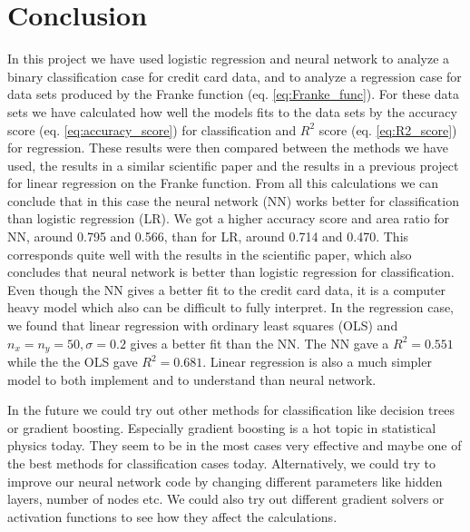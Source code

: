 \documentclass[12pt,a4paper,english]{article}
\begin{document}
\section{Conclusion}
In this project we have used logistic regression and neural network to analyze a binary classification case for credit card data, and to analyze a regression case for data sets produced by the Franke function (eq. \ref{eq:Franke_func}). For these data sets we have calculated how well the models fits to the data sets by the accuracy score (eq. \ref{eq:accuracy_score}) for classification and $R^2$ score (eq. \ref{eq:R2_score}) for regression. These results were then compared between the methods we have used, the results in a similar scientific paper \cite{origarticle} and the results in a previous project \cite{proj1} for linear regression on the Franke function. From all this calculations we can conclude that in this case the neural network (NN) works better for classification than logistic regression (LR). We got a higher accuracy score and area ratio for NN, around 0.795 and 0.566, than for LR, around 0.714 and 0.470. This corresponds quite well with the results in the scientific paper, which also concludes that neural network is better than logistic regression for classification. Even though the NN gives a better fit to the credit card data, it is a computer heavy model which also can be difficult to fully interpret. In the regression case, we found that linear regression with ordinary least squares (OLS) and $n_x=n_y=50, \sigma=0.2$ gives a better fit than the NN. The NN gave a $R^2=0.551$ while the the OLS gave $R^2=0.681$. Linear regression is also a much simpler model to both implement and to understand than neural network.

In the future we could try out other methods for classification like decision trees or gradient boosting. Especially gradient boosting is a hot topic in statistical physics today. They seem to be in the most cases very effective and maybe one of the best methods for classification cases today. Alternatively, we could try to improve our neural network code by changing different parameters like hidden layers, number of nodes etc. We could also try out different gradient solvers or activation functions to see how they affect the calculations.
\end{document}
